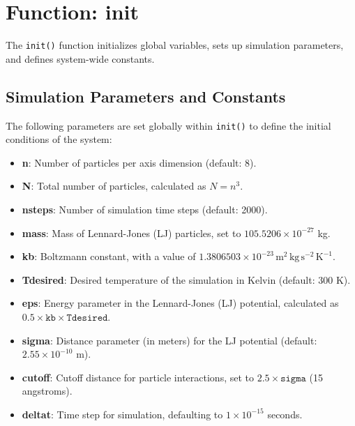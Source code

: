 \documentclass[12pt, ngerman]{report}
\begin{document}
\section{Function: init}
\label{sec:init_function}

The \texttt{init()} function initializes global variables, sets up simulation parameters, and defines system-wide constants. %


\subsection*{Simulation Parameters and Constants}

The following parameters are set globally within \texttt{init()} to define the initial conditions of the system:

\begin{itemize}
	\item \textbf{n}: Number of particles per axis dimension (default: 8).
	\item \textbf{N}: Total number of particles, calculated as \(N = n^3\).
	\item \textbf{nsteps}: Number of simulation time steps (default: 2000).
	\item \textbf{mass}: Mass of Lennard-Jones (LJ) particles, set to \(105.5206 \times 10^{-27}\) kg.
	\item \textbf{kb}: Boltzmann constant, with a value of \(1.3806503 \times 10^{-23} \, \text{m}^2 \, \text{kg} \, \text{s}^{-2} \, \text{K}^{-1}\).
	\item \textbf{Tdesired}: Desired temperature of the simulation in Kelvin (default: 300 K).
	\item \textbf{eps}: Energy parameter in the Lennard-Jones (LJ) potential, calculated as \(0.5 \times \texttt{kb} \times \texttt{Tdesired}\).
	\item \textbf{sigma}: Distance parameter (in meters) for the LJ potential (default: \(2.55 \times 10^{-10}\) m).
	\item \textbf{cutoff}: Cutoff distance for particle interactions, set to \(2.5 \times \texttt{sigma}\) (15 angstroms).
	\item \textbf{deltat}: Time step for simulation, defaulting to \(1 \times 10^{-15}\) seconds.
\end{itemize}
\end{document}
